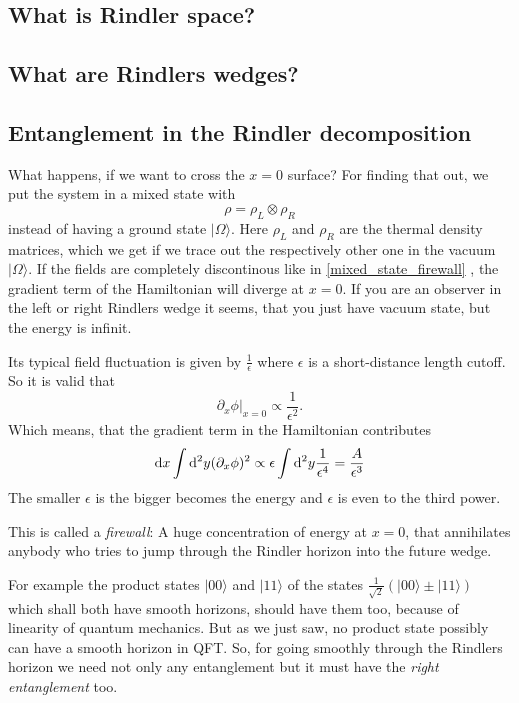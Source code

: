 	 
	\subsection{What is Rindler space?}
	
	
	\subsection{What are Rindlers wedges?}

	\subsection{Entanglement in the Rindler decomposition \checkmark}
	What happens, if we want to cross the $x=0$ surface? For finding that out, we put the system in a mixed state with
		\begin{equation} \label{mixed_state_firewall}
			\rho=\rho_L \otimes \rho_R
		\end{equation}
	instead of having a ground state $|\Omega\rangle$. Here $\rho_L$ and $\rho_R$ are the thermal density matrices, which we get if we trace out the respectively other one in the vacuum $|\Omega\rangle$.
	If the fields are completely discontinous like in \eqref{mixed_state_firewall} , the gradient term of the Hamiltonian will diverge at $x=0$. If you are an observer in the left or right Rindlers wedge it seems, that you just have vacuum state, but the energy is infinit. 
	
	Its typical field fluctuation is given by $\frac{1}{\epsilon}$ where $\epsilon$ is a short-distance length cutoff.  So it is valid that
		\begin{equation}
			\partial_x \phi|_{x=0} \propto \frac{1}{\epsilon^2}.
		\end{equation}
	Which means, that the gradient term in the Hamiltonian contributes
		\begin{equation}
			\mathrm{d} x \int \mathrm{d}^2 y (\partial_x\phi)^2 \propto 
			\epsilon \int \mathrm{d}^2 y \frac{1}{\epsilon^4} 
			= \frac{A}{\epsilon^3}
		\end{equation}	
	The smaller $\epsilon$ is the bigger becomes the energy and $\epsilon$ is even to the third power.
	 			
	This is called a \textit{firewall}: A huge concentration of energy at $x=0$, that annihilates anybody who tries to jump through the Rindler horizon into the future wedge.
	
	For example the product states $|00\rangle$ and $|11\rangle$ of the states $\frac{1}{\sqrt{2}}
	(|00\rangle \pm |11\rangle)$ which shall both have smooth horizons, should have them too, because of linearity of quantum mechanics. But as we just saw, no product state possibly can have a smooth horizon in QFT. So, for going smoothly through the Rindlers horizon we need not only any entanglement but it must have the \textit{right entanglement} too.